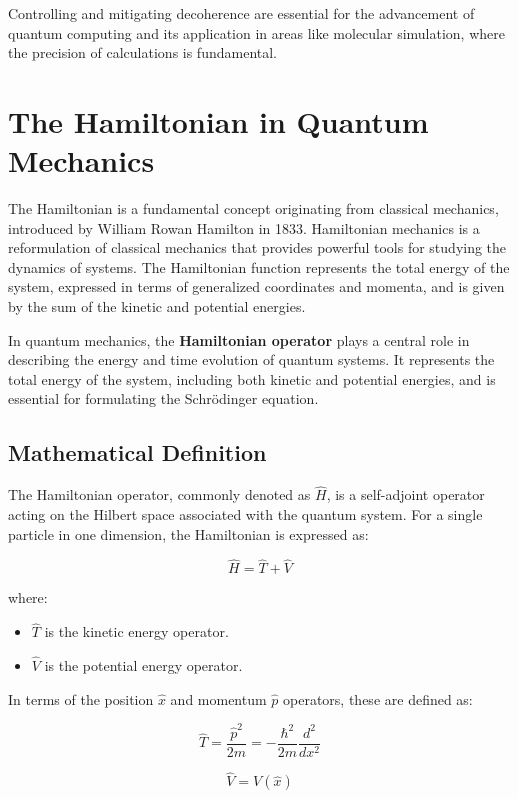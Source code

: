 Controlling and mitigating decoherence are essential for the advancement of quantum computing and its application in areas like molecular simulation, where the precision of calculations is fundamental.

\section{The Hamiltonian in Quantum Mechanics}

The Hamiltonian is a fundamental concept originating from classical mechanics, introduced by William Rowan Hamilton in 1833. Hamiltonian mechanics is a reformulation of classical mechanics that provides powerful tools for studying the dynamics of systems. The Hamiltonian function represents the total energy of the system, expressed in terms of generalized coordinates and momenta, and is given by the sum of the kinetic and potential energies.

In quantum mechanics, the \textbf{Hamiltonian operator} plays a central role in describing the energy and time evolution of quantum systems. It represents the total energy of the system, including both kinetic and potential energies, and is essential for formulating the Schrödinger equation.

\subsection{Mathematical Definition}

The Hamiltonian operator, commonly denoted as \( \hat{H} \), is a self-adjoint operator acting on the Hilbert space associated with the quantum system. For a single particle in one dimension, the Hamiltonian is expressed as:

\[
\hat{H} = \hat{T} + \hat{V}
\]

where:

\begin{itemize}
    \item \( \hat{T} \) is the kinetic energy operator.
    \item \( \hat{V} \) is the potential energy operator.
\end{itemize}

In terms of the position \( \hat{x} \) and momentum \( \hat{p} \) operators, these are defined as:

\[
\hat{T} = \frac{\hat{p}^2}{2m} = -\frac{\hbar^2}{2m} \frac{d^2}{dx^2}
\]

\[
\hat{V} = V(\hat{x})
\]

